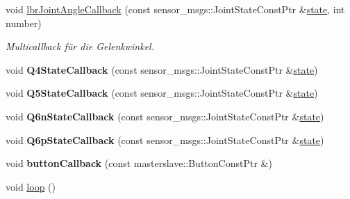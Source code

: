\begin{DoxyCompactItemize}
void \hyperlink{classNumericKinematicCommander_affceeb31adedb29f756e7b8804e5c5e7}{lbr\-Joint\-Angle\-Callback} (const sensor\-\_\-msgs\-::\-Joint\-State\-Const\-Ptr \&\hyperlink{classICommander_a72cb524deeb95b224db0242efc4728d4}{state}, int number)
\begin{DoxyCompactList}\small\item\em Multicallback für die Gelenkwinkel. \end{DoxyCompactList}\item 
\hypertarget{classNumericKinematicCommander_aff19777ef66a5931f9c138477063631d}{void {\bfseries Q4\-State\-Callback} (const sensor\-\_\-msgs\-::\-Joint\-State\-Const\-Ptr \&\hyperlink{classICommander_a72cb524deeb95b224db0242efc4728d4}{state})}\label{classNumericKinematicCommander_aff19777ef66a5931f9c138477063631d}

\item 
\hypertarget{classNumericKinematicCommander_a224d7ed8bbeeddd5291b8b64b1793ad8}{void {\bfseries Q5\-State\-Callback} (const sensor\-\_\-msgs\-::\-Joint\-State\-Const\-Ptr \&\hyperlink{classICommander_a72cb524deeb95b224db0242efc4728d4}{state})}\label{classNumericKinematicCommander_a224d7ed8bbeeddd5291b8b64b1793ad8}

\item 
\hypertarget{classNumericKinematicCommander_a8e36a50f45426dad83f8c9b4f551e623}{void {\bfseries Q6n\-State\-Callback} (const sensor\-\_\-msgs\-::\-Joint\-State\-Const\-Ptr \&\hyperlink{classICommander_a72cb524deeb95b224db0242efc4728d4}{state})}\label{classNumericKinematicCommander_a8e36a50f45426dad83f8c9b4f551e623}

\item 
\hypertarget{classNumericKinematicCommander_abf4374b164af476e526351ea413ebbc0}{void {\bfseries Q6p\-State\-Callback} (const sensor\-\_\-msgs\-::\-Joint\-State\-Const\-Ptr \&\hyperlink{classICommander_a72cb524deeb95b224db0242efc4728d4}{state})}\label{classNumericKinematicCommander_abf4374b164af476e526351ea413ebbc0}

\item 
\hypertarget{classNumericKinematicCommander_a27d9af68ec4d6d0f2dfbc00164856ed4}{void {\bfseries button\-Callback} (const masterslave\-::\-Button\-Const\-Ptr \&)}\label{classNumericKinematicCommander_a27d9af68ec4d6d0f2dfbc00164856ed4}

\item 
void \hyperlink{classNumericKinematicCommander_a95aed1cb2b8c58e82b4933972c4b2bf8}{loop} ()
\end{DoxyCompactItemize}
